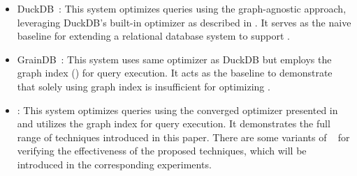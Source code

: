 \begin{itemize}
\item DuckDB~\cite{duckdb}: This system optimizes queries using the graph-agnostic approach, leveraging DuckDB's built-in optimizer as described in . It serves as the naive baseline for extending a relational database system to support \spjm.

\item GrainDB~\cite{duckdb}: This system uses same optimizer as DuckDB but employs the graph index () for query execution. It acts as the baseline to demonstrate that solely using graph index is insufficient for optimizing \spjm.


\item \name: This system optimizes queries using the converged optimizer presented in  and utilizes the graph index for query execution. It demonstrates the full range of techniques introduced in this paper. There are some variants
of \name~ for verifying the effectiveness of the proposed techniques, which will be introduced in the corresponding experiments.
\end{itemize}

